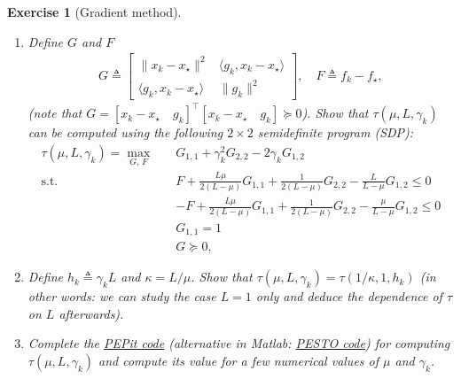 \documentclass[11pt,a4paper]{article}
\newcommand{\normsq}[1]{{\left\lVert#1\right\rVert}^2}
\newcommand{\inner}[2]{{\langle #1, #2\rangle}}
\newcommand{\pesto}{{PESTO }}
\newcommand{\pepit}{{PEPit }}
\newtheorem{exercise}{Exercise}
\begin{document}
\begin{exercise}[Gradient method]
\begin{enumerate}
\begin{equation*}
\begin{aligned}
		\text{s.t. } & f_\star\geqslant f_k+\inner{g_k}{x_\star-x_k}+\tfrac{1}{2L}\normsq{g_\star-g_k}+\tfrac{\mu}{2(1-\mu/L)}\normsq{x_\star-x_k-\tfrac{1}{L}(g_\star-g_k)}\\
			&f_k\geqslant f_\star+\inner{g_\star}{x_k-x_\star}+\tfrac{1}{2L}\normsq{g_k-g_\star}+\tfrac{\mu}{2(1-\mu/L)}\normsq{x_k-x_\star-\tfrac{1}{L}(g_k-g_\star)}\\
		& \|x_k-x_\star\|^2 = 1\\
		& x_{k+1}=x_k-\gamma_k  g_k\\
		& g_\star=0.\\
		\end{aligned}
		\end{equation*}
	\item Define $G$ and $F$
			\begin{align*}
			G \triangleq \begin{bmatrix}
			\|x_k-x_\star\|^2 & \langle g_k,x_k-x_\star\rangle\\
			\langle g_k, x_k-x_\star\rangle & \| g_k\|^2
			\end{bmatrix},\quad 	F \triangleq 			f_k-f_\star,
			\end{align*}
			(note that $G=[x_k-x_\star \quad g_k]^\top [x_k-x_\star \quad g_k]\succcurlyeq 0$). Show that $\tau(\mu,L,\gamma_k)$ can be computed using the following $2\times 2$ semidefinite program (SDP):  
			\begin{equation}\label{ex1:eq:SDP_grad}
			\begin{aligned}
			\tau(\mu,L,\gamma_k)=\max_{G,\, F} \quad & G_{1,1}+\gamma_k ^2 G_{2,2}-2\gamma_k G_{1,2}\\
			\text{s.t. } \quad & F + \tfrac{L\mu}{2(L-\mu)} G_{1,1}+\tfrac{1}{2(L-\mu)}G_{2,2}-\tfrac{L}{L-\mu}G_{1,2}\leqslant 0\\
			&-F + \tfrac{L\mu}{2(L-\mu)} G_{1,1}+\tfrac{1}{2(L-\mu)}G_{2,2}-\tfrac{\mu}{L-\mu}G_{1,2}\leqslant 0\\
			&G_{1,1}= 1\\
			&G\succcurlyeq 0,
			\end{aligned}
			\end{equation}
	\item Define $h_k\triangleq \gamma_k L$ and $\kappa=L/\mu$. Show that $\tau(\mu,L,\gamma_k)=\tau(1/\kappa,1,h_k)$ (in other words: we can study the case $L=1$ only and deduce the dependence of $\tau$ on $L$ afterwards).
	\item Complete the \href{https://github.com/PerformanceEstimation/Learning-Performance-Estimation/tree/main/Exercises - codes/Jupyter/Exercise1.ipynb}{\pepit code} (alternative in Matlab: \href{https://github.com/PerformanceEstimation/Learning-Performance-Estimation/blob/main/Exercises - codes/Matlab/Exercise1.m}{\pesto code}) for computing $\tau(\mu,L,\gamma_k)$ and compute its value for a few numerical values of $\mu$ and $\gamma_k$. 

\end{enumerate}
\end{exercise}
\end{document}
